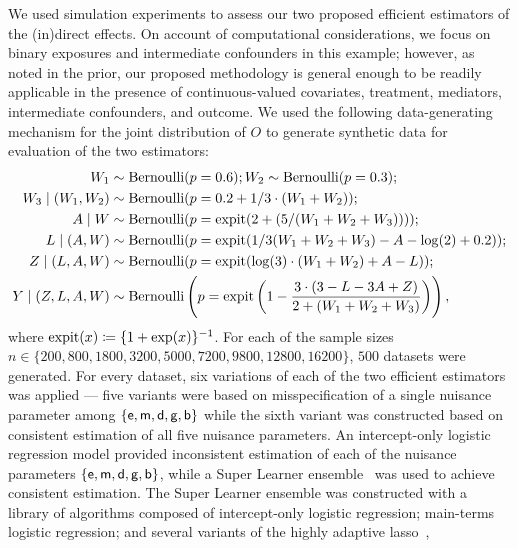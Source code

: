 We used simulation experiments to assess our two proposed efficient estimators
of the (in)direct effects. On account of computational considerations, we focus
on binary exposures and intermediate confounders in this example; however, as
noted in the prior, our proposed methodology is general enough to be readily
applicable in the presence of continuous-valued covariates, treatment,
mediators, intermediate confounders, and outcome. We used the following
data-generating mechanism for the joint distribution of $O$ to generate
synthetic data for evaluation of the two estimators:
\begin{align*}
W_1 &\sim \text{Bernoulli}(p = 0.6);
W_2 \sim \text{Bernoulli}(p = 0.3);\\
W_3 \mid (W_1, W_2) &\sim \text{Bernoulli}(p = 0.2 + 1/3 \cdot (W_1 + W_2));\\
A \mid W &\sim \text{Bernoulli}(p = \operatorname{expit}(2 + (5 / (W_1 +
    W_2 + W_3))));\\
L \mid (A, W) &\sim \text{Bernoulli}(p = \operatorname{expit}(1/3(W_1 + W_2 + W_3) - A -
  \log(2) + 0.2));\\
Z \mid (L, A, W) &\sim \text{Bernoulli}(p = \operatorname{expit}(\log(3) \cdot (W_1 + W_2)
    + A - L));\\
Y \mid (Z, L, A, W) &\sim \text{Bernoulli}\left(p = \operatorname{expit}\left(1 -
   \frac{3 \cdot (3 - L - 3A + Z)}{2 + (W_1 + W_2 + W_3)} \right)\right),
\end{align*}
where $\operatorname{expit}(x) \coloneqq \{1 + \exp(x)\}^{-1}$. For each of the sample sizes
$n \in \{200, 800, 1800, 3200, 5000, 7200, \allowbreak 9800, 12800,
16200\}$, $500$ datasets were generated. For every dataset, six variations of
each of the two efficient estimators was applied --- five variants were based on
misspecification of a single nuisance parameter among $\{\mathsf{e}, \mathsf{m}, \mathsf{d}, \mathsf{g}, \mathsf{b}\}$
while the sixth variant was constructed based on consistent estimation of all
five nuisance parameters. An intercept-only logistic regression model
provided inconsistent estimation of each of the nuisance parameters $\{\mathsf{e}, \mathsf{m},
\mathsf{d}, \mathsf{g}, \mathsf{b}\}$, while a Super Learner ensemble~\citep{vdl2007super} was used to
achieve consistent estimation. The Super Learner ensemble was constructed with
a library of algorithms composed of intercept-only logistic regression;
main-terms logistic regression; and several variants of the highly adaptive
lasso~\citep{benkeser2016highly, vdl2017generally, coyle2020hal9001},
